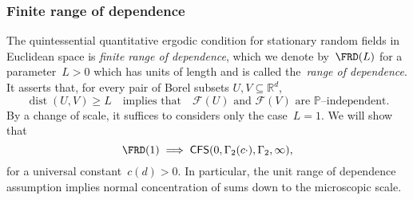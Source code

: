 \documentclass[11pt]{article} %
\numberwithin{equation}{section}
\theoremstyle{definition}
\newcommand*{\Rd}{\ensuremath{\mathbb{R}^d}}
\newcommand{\F}{\mathcal{F}}
\renewcommand{\P}{\mathbb{P}}
\DeclareMathOperator{\dist}{dist}
\newcommand{\CFS}{\mathsf{CFS}}
\begin{document}
\subsubsection{Finite range of  dependence}
The quintessential quantitative ergodic condition for stationary random fields in Euclidean space is \emph{finite range of dependence}, which we denote by~$\FRD(L)$ for a parameter~$L>0$ which has units of length and is called the~\emph{range of dependence}. It asserts that, for every pair of Borel subsets $U,V\subseteq\Rd$,
\begin{equation} 
\label{e.unitrange}
\dist(U,V) \geq L
\quad\mbox{implies that} \quad 
\mbox{$\F(U)$ and $\F(V)$ are $\P$--independent.}
\end{equation}
By a change of scale, it suffices to considers only the case~$L=1$. We will show that 
\begin{equation}
\label{e.URDyes}
\FRD(1) \implies \CFS(0,\Gamma_2(c\cdot),\Gamma_2,\infty),
\end{equation}
for a universal constant~$c(d)>0$. In particular, the unit range of dependence assumption implies normal concentration of sums down to the microscopic scale.

\smallskip
\end{document}
